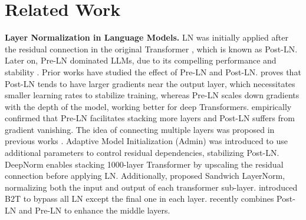 \section{Related Work}
\textbf{Layer Normalization in Language Models.} 
LN \citep{ba2016layer} was initially applied after the residual connection in the original Transformer \citep{vaswani2017attention}, which is known as Post-LN. Later on, Pre-LN  \citep{baevski2018adaptive,dai2019transformer,nguyen2019transformers} dominated LLMs, due to its compelling performance and stability \citep{brown2020language,touvron2023llama,jiang2023mistral,bi2024deepseek}. Prior works have studied the effect of Pre-LN and Post-LN. 
\citet{xiong2020layer} proves that Post-LN tends to have larger gradients near the output layer, which necessitates smaller learning rates to stabilize training, whereas Pre-LN scales down gradients with the depth of the model, working better for deep Transformers.  \citet{wang2019learning} empirically confirmed that Pre-LN facilitates stacking more layers and Post-LN suffers from gradient vanishing. The idea of connecting multiple layers was proposed in previous works \citep{bapna2018training,dou2018exploiting,wang2019learning}. Adaptive Model Initialization (Admin) was introduced to use additional parameters to control residual dependencies, stabilizing Post-LN. DeepNorm \citep{wang2024deepnet} enables stacking 1000-layer Transformer by upscaling the residual connection before applying LN. Additionally, \citet{ding2021cogview} proposed Sandwich LayerNorm, normalizing both the input and output of each transformer sub-layer. \citet{takase2022b2t} introduced B2T to bypass all LN except the final one in each layer. \citet{li2024mix} recently combines Post-LN and Pre-LN to enhance the middle layers.